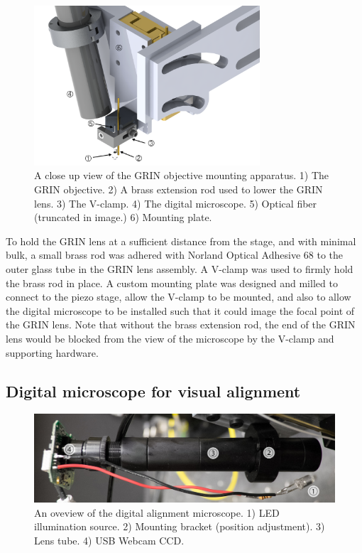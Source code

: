 \begin{figure}[h!]
\centering
\includegraphics[width=0.75\textwidth]{Images/Alignment/close_up.png}
\caption[A close up view of the GRIN objective mounting apparatus.]{A close up view of the GRIN objective mounting apparatus. 1) The GRIN objective. 2) A brass extension rod used to lower the GRIN lens. 3) The V-clamp. 4) The digital microscope. 5) Optical fiber (truncated in image.) 6) Mounting plate.}
\end{figure}

To hold the GRIN lens at a sufficient distance from the stage, and with minimal bulk, a small brass rod was adhered with Norland Optical Adhesive 68 to the outer glass tube in the GRIN lens assembly. A V-clamp was used to firmly hold the brass rod in place. A custom mounting plate was designed and milled to connect to the piezo stage, allow the V-clamp to be mounted, and also to allow the digital microscope to be installed such that it could image the focal point of the GRIN lens. Note that without the brass extension rod, the end of the GRIN lens would be blocked from the view of the microscope by the V-clamp and supporting hardware.

\subsection{Digital microscope for visual alignment}


\begin{figure}[h!]
\centering
\includegraphics[width=1.0\textwidth]{Images/Photographs/DSCF1699_an.jpg}
\caption[An overview of the digital alignment microscope.]{An oveview of the digital alignment microscope. 1) LED illumination source. 2) Mounting bracket (position adjustment). 3) Lens tube. 4) USB Webcam CCD.}
\end{figure}

